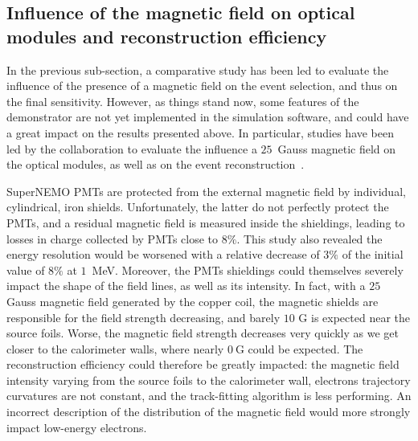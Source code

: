 
\subsection{Influence of the magnetic field on optical modules and reconstruction efficiency}

In the previous sub-section, a comparative study has been led to evaluate the influence of the presence of a magnetic field on the event selection, and thus on the final sensitivity.
However, as things stand now, some features of the demonstrator are not yet implemented in the simulation software, and could have a great impact on the results presented above.
In particular, studies have been led by the collaboration to evaluate the influence a $25$~Gauss magnetic field on the optical modules, as well as on the event reconstruction~\cite{CalvezThesis}\cite{internal:magnetic_field}.

SuperNEMO PMTs are protected from the external magnetic field by individual, cylindrical, iron shields.
Unfortunately, the latter do not perfectly protect the PMTs, and a residual magnetic field is measured inside the shieldings, leading to losses in charge collected by PMTs close to $8\%$.
This study also revealed the energy resolution would be worsened with a relative decrease of $3\%$ of the initial value of $8\%$ at $1$~MeV.
Moreover, the PMTs shieldings could themselves severely impact the shape of the field lines, as well as its intensity.
In fact, with a $25$ Gauss magnetic field generated by the copper coil, the magnetic shields are responsible for the field strength decreasing, and barely $10$ G is expected near the source foils.
Worse, the magnetic field strength decreases very quickly as we get closer to the calorimeter walls, where nearly $0~$G could be expected.
The reconstruction efficiency could therefore be greatly impacted:
the magnetic field intensity varying from the source foils to the calorimeter wall, electrons trajectory curvatures are not constant, and the track-fitting algorithm is less performing.
An incorrect description of the distribution of the magnetic field would more strongly impact low-energy electrons.


